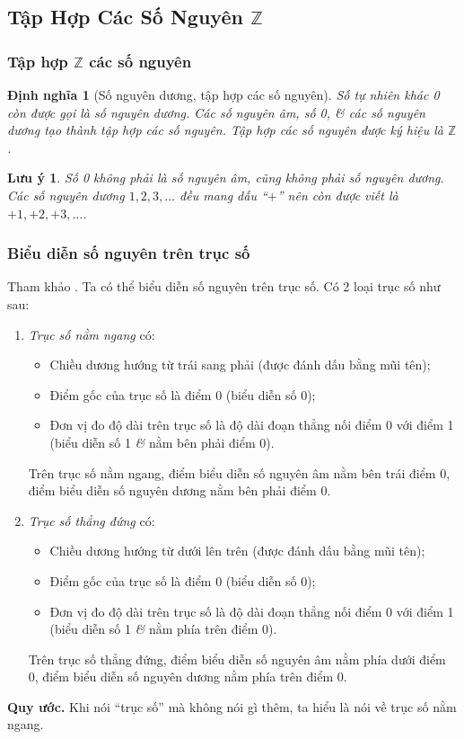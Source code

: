 \documentclass{article}
\numberwithin{equation}{section}
\newtheorem{definition}{Định nghĩa}[section]
\newtheorem{remark}{Lưu ý}[section]
\begin{document}
\subsection{Tập Hợp Các Số Nguyên $\mathbb{Z}$}

\subsubsection{Tập hợp $\mathbb{Z}$ các số nguyên}

\begin{definition}[Số nguyên dương, tập hợp các số nguyên]
	Số tự nhiên khác 0 còn được gọi là \emph{số nguyên dương}. Các số nguyên âm, số 0, \textit{\&} các số nguyên dương tạo thành tập hợp các số nguyên. Tập hợp các số nguyên được ký hiệu là $\mathbb{Z}$.
\end{definition}

\begin{remark}
	Số 0 không phải là số nguyên âm, cũng không phải số nguyên dương. Các số nguyên dương $1,2,3,\ldots$ đều mang dấu ``$+$'' nên còn được viết là $+1,+2,+3,\ldots$.
\end{remark}

\subsubsection{Biểu diễn số nguyên trên trục số}
Tham khảo \cite[pp. 65--66]{Thai_Anh_Dat_Ha_Loan_Nam_Quang_Toan_6_tap_1}. Ta có thể biểu diễn số nguyên trên trục số. Có 2 loại trục số như sau:
\begin{enumerate}
	\item \textit{Trục số nằm ngang} có:
	\begin{itemize}
		\item Chiều dương hướng từ trái sang phải (được đánh dấu bằng mũi tên);
		\item Điểm gốc của trục số là điểm 0 (biểu diễn số 0);
		\item Đơn vị đo độ dài trên trục số là độ dài đoạn thẳng nối điểm 0 với điểm 1 (biểu diễn số 1 \textit{\&} nằm bên phải điểm 0).
	\end{itemize}
	Trên trục số nằm ngang, điểm biểu diễn số nguyên âm nằm bên trái điểm 0, điểm biểu diễn số nguyên dương nằm bên phải điểm 0.
	\item \textit{Trục số thẳng đứng} có:
	\begin{itemize}
		\item Chiều dương hướng từ dưới lên trên (được đánh dấu bằng mũi tên);
		\item Điểm gốc của trục số là điểm 0 (biểu diễn số 0);
		\item Đơn vị đo độ dài trên trục số là độ dài đoạn thẳng nối điểm 0 với điểm 1 (biểu diễn số 1 \textit{\&} nằm phía trên điểm 0).
	\end{itemize}
	Trên trục số thẳng đứng, điểm biểu diễn số nguyên âm nằm phía dưới điểm 0, điểm biểu diễn số nguyên dương nằm phía trên điểm 0.
\end{enumerate}
\noindent\textbf{Quy ước.} Khi nói ``trục số'' mà không nói gì thêm, ta hiểu là nói về trục số nằm ngang.
\end{document}
